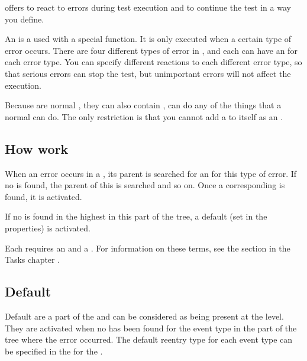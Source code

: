 

\app{} offers \gdehandlers{} to react to errors during test execution and to continue the test in a way you define. 

An \gdehandler{}  is a \gdcase{} used with a special function. It is only executed when a certain type of error occurs. There are four different types of error in \app{}, and each \gdcase{} can have an \gdehandler{} for each error type.  You can specify different reactions to each different error type, so that serious errors can stop the test, but unimportant errors will not affect the execution.  

Because \gdehandlers{} are normal \gdcases{}, they can also contain \gdehandlers{},  can do any of the things that a normal \gdcase{} can do. The only restriction is that you cannot add a \gdcase{} to itself as an \gdehandler{}. 

\subsection{How \gdehandlers work}
When an error occurs in a \gdstep{}, its parent \gdcase{} is searched for 
an \gdehandler{} for this type of error.
 If no \gdehandler{} is found, the parent \gdcase{} of this 
\gdcase{} is searched and so on. Once a corresponding \gdehandler{} is found, 
it is activated. 

If no \gdehandler{} is found in the highest \gdcase{} in this part of the tree, 
a default \gdehandler{} (set in the \gdsuite{} properties) is activated. 

Each \gdehandler{} requires an  and a
 . For information on these terms, see the section in the Tasks chapter .  

\subsection{Default \gdehandlers{}}
Default \gdehandlers{} are a part of the \gdsuite{} and can be considered 
as being present at the \gdsuite{} level. They  are activated when 
no \gdehandler{} has been found for the event type in the part of the tree
where the error occurred. The default reentry type for each 
event type can be specified in the \gdpropview{} for the \gdtestsuiteeditor{}. 

